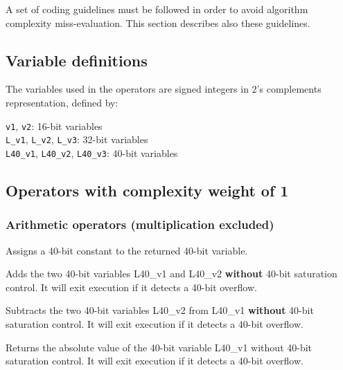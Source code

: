 A set of coding guidelines must be followed in order to avoid algorithm complexity miss-evaluation.
This section describes also these guidelines.

\subsection{Variable definitions}

The variables used in the operators are signed integers in 2's complements representation, defined by:

{\tt v1}, {\tt v2}: 16-bit variables\\
{\tt L\_v1}, {\tt L\_v2}, {\tt L\_v3}: 32-bit variables\\
{\tt L40\_v1}, {\tt L40\_v2}, {\tt L40\_v3}: 40-bit variables\\

\subsection{Operators with complexity weight of 1}
\subsubsection{Arithmetic operators (multiplication excluded)}


Assigns a 40-bit constant to the returned 40-bit variable.


Adds the two 40-bit variables L40\_v1 and L40\_v2 \textbf{without} 40-bit saturation control.
It will exit execution if it detects a 40-bit overflow.



Subtracts the two 40-bit variables L40\_v2 from L40\_v1 \textbf{without} 40-bit saturation control.
It will exit execution if it detects a 40-bit overflow.


Returns the absolute value of the 40-bit variable L40\_v1 without 40-bit saturation control.
It will exit execution if it detects a 40-bit overflow.

